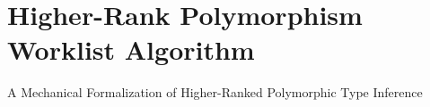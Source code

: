 \chapter{Higher-Rank Polymorphism Worklist Algorithm}
\label{chap:ICFP}

A Mechanical Formalization of Higher-Ranked Polymorphic
  Type Inference



%





